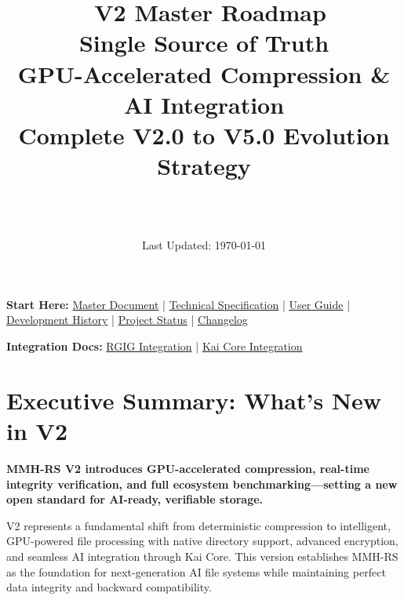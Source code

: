 \documentclass[12pt,a4paper]{article}
\title{\Huge\textbf{\project\ V2 Master Roadmap}\\[0.5cm]
\Large\textbf{Single Source of Truth}\\[0.3cm]
\large GPU-Accelerated Compression \& AI Integration\\[0.5cm]
\large Complete V2.0 to V5.0 Evolution Strategy}
\author{\Large\authorname\\[0.2cm]\email\\[0.2cm]\github}
\date{\large Last Updated: \today}
\begin{document}
\maketitle
\thispagestyle{empty}

\begin{tcolorbox}[colback=blue!10,colframe=blue!50,title=\textbf{Full Documentation Suite}]
\textbf{Start Here:} \href{MMH-RS_MASTER_DOCUMENT.pdf}{Master Document} | \href{MMH-RS_TECHNICAL_COMPLETE.pdf}{Technical Specification} | \href{USER_GUIDE.md}{User Guide} | \href{DEVELOPMENT_HISTORY.md}{Development History} | \href{PROJECT_STATUS.md}{Project Status} | \href{CHANGELOG.md}{Changelog}

\textbf{Integration Docs:} \href{RGIG_INTEGRATION_COMPLETE.pdf}{RGIG Integration} | \href{KAI_CORE_INTEGRATION_COMPLETE.pdf}{Kai Core Integration}
\end{tcolorbox}

\tableofcontents
\newpage

\section{Executive Summary: What's New in V2}

\begin{tcolorbox}[colback=v2blue!10,colframe=v2blue!50,title=\textbf{MMH-RS V2 Executive Summary}]
\textbf{MMH-RS V2 introduces GPU-accelerated compression, real-time integrity verification, and full ecosystem benchmarking—setting a new open standard for AI-ready, verifiable storage.}

V2 represents a fundamental shift from deterministic compression to intelligent, GPU-powered file processing with native directory support, advanced encryption, and seamless AI integration through Kai Core. This version establishes MMH-RS as the foundation for next-generation AI file systems while maintaining perfect data integrity and backward compatibility.
\end{tcolorbox}
\end{document}
